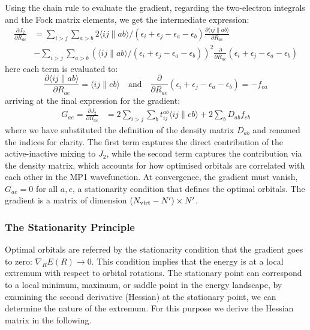 Using the chain rule to evaluate the gradient, regarding the two-electron integrals and the Fock matrix elements, we get the intermediate expression:
\begin{align}
    \frac{\partial J_2}{\partial R_{ae}} 
    &=
    \sum_{i>j}\sum_{a>b} 2 \langle ij\|ab\rangle / (\epsilon_i + \epsilon_j - \epsilon_a - \epsilon_b) \frac{\partial \langle ij\|ab\rangle}{\partial R_{ae}}
    \\
    &- \sum_{i>j}\sum_{a>b} (\langle ij\|ab\rangle / (\epsilon_i + \epsilon_j - \epsilon_a - \epsilon_b))^2 \frac{\partial}{\partial R_{ae}} (\epsilon_i + \epsilon_j - \epsilon_a - \epsilon_b)
\end{align}
here each term is evaluated to:
\begin{equation}
    \frac{\partial \langle ij\|ab\rangle}{\partial R_{ae}} = \langle ij\|eb\rangle
    \quad \text{and} \quad
    \frac{\partial}{\partial R_{ae}} (\epsilon_i + \epsilon_j - \epsilon_a - \epsilon_b) = - f_{ea} 
\end{equation}
arriving at the final expression for the gradient:
\begin{align}
    G_{ae} = \frac{\partial J_2}{\partial R_{ae}} 
    &= 2\sum_{i>j}\sum_{b} t_{ij}^{ab} \langle ij\|eb\rangle + 2 \sum_{b} D_{ab} f_{eb}
\end{align}
where we have substituted the definition of the density matrix $D_{ab}$ and renamed the indices for clarity. The first term captures the direct contribution of the active-inactive mixing to $J_2$, while the second term captures the contribution via the density matrix, which accounts for how optimised orbitals are correlated with each other in the MP1 wavefunction. At convergence, the gradient must vanish, $G_{ae} = 0$ for all $a,e$, a stationarity condition that defines the optimal orbitals. The gradient is a matrix of dimension $(N_{\rm virt} - N') \times N'$. 


\subsubsection{The Stationarity Principle}

 Optimal orbitals are referred by the stationarity condition that the gradient goes to zero: $\nabla_R E(R) \rightarrow 0$. This condition implies that the energy is at a local extremum with respect to orbital rotations. The stationary point can correspond to a local minimum, maximum, or saddle point in the energy landscape, by examining the second derivative (Hessian) at the stationary point, we can determine the nature of the extremum. For this purpose we derive the Hessian matrix in the following. %


